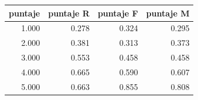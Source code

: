 \begin{tabular}{rrrr}
\toprule
puntaje & puntaje R & puntaje F & puntaje M \\
\midrule
1.000 & 0.278 & 0.324 & 0.295 \\
2.000 & 0.381 & 0.313 & 0.373 \\
3.000 & 0.553 & 0.458 & 0.458 \\
4.000 & 0.665 & 0.590 & 0.607 \\
5.000 & 0.663 & 0.855 & 0.808 \\
\bottomrule
\end{tabular}